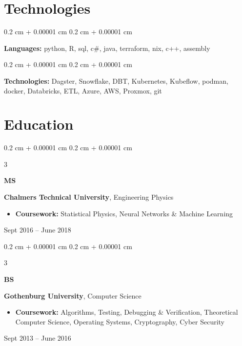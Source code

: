 \documentclass[10pt, letterpaper]{article}
\newenvironment{highlights}{
    \begin{itemize}[
        topsep=0.10 cm,
        parsep=0.10 cm,
        partopsep=0pt,
        itemsep=0pt,
        leftmargin=0.4 cm + 10pt
    ]
}{
    \end{itemize}
} %
\newenvironment{onecolentry}{
    \begin{adjustwidth}{
        0.2 cm + 0.00001 cm
    }{
        0.2 cm + 0.00001 cm
    }
}{
    \end{adjustwidth}
} %
\newenvironment{threecolentry}[3][]{
    \onecolentry
    \def\thirdColumn{#3}
    \setcolumnwidth{1 cm, \fill, 4.5 cm}
    \begin{paracol}{3}
    {\raggedright #2} \switchcolumn
}{
    \switchcolumn \raggedleft \thirdColumn
    \end{paracol}
    \endonecolentry
} %
\begin{document}
    
    \section{Technologies}



        
        \begin{onecolentry}
            \textbf{Languages:} python, R, sql, c\#, java, terraform, nix, c++, assembly
        \end{onecolentry}

        \vspace{0.2 cm}

        \begin{onecolentry}
            \textbf{Technologies:} Dagster, Snowflake, DBT, Kubernetes, Kubeflow, podman, docker, Databricks, ETL, Azure, AWS, Proxmox, git
        \end{onecolentry}


    
    \section{Education}



        
        \begin{threecolentry}{\textbf{MS}}{
            Sept 2016 – June 2018
        }
            \textbf{Chalmers Technical University}, Engineering Physics
            \begin{highlights}
                \item \textbf{Coursework:} Statistical Physics, Neural Networks \& Machine Learning
            \end{highlights}
        \end{threecolentry}

        \vspace{0.2 cm}

        \begin{threecolentry}{\textbf{BS}}{
            Sept 2013 – June 2016
        }
            \textbf{Gothenburg University}, Computer Science
            \begin{highlights}
                \item \textbf{Coursework:} Algorithms, Testing, Debugging \& Verification, Theoretical Computer Science, Operating Systems, Cryptography, Cyber Security
            \end{highlights}
        \end{threecolentry}
\end{document}
